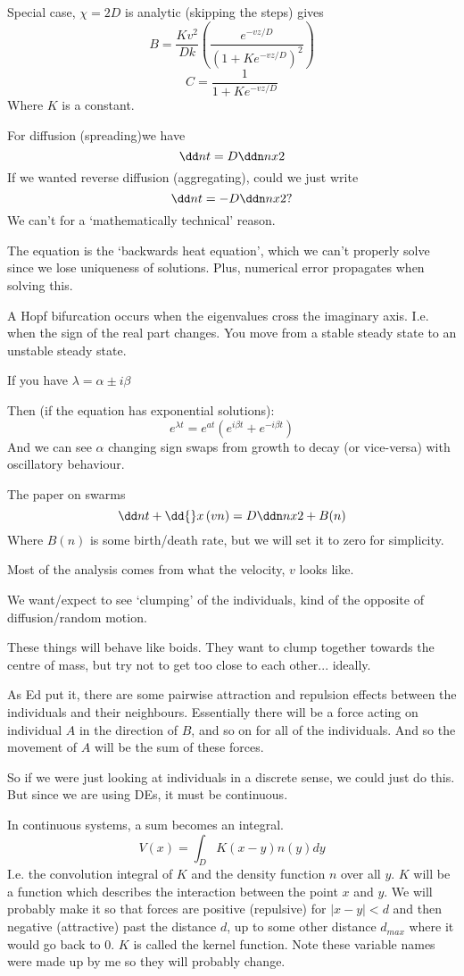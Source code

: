 \documentclass{X:/Documents/Coding/Latex/myassignment}
\begin{document}
Special case, $\chi = 2D$ is analytic (skipping the steps) gives
\[B = \frac{K v^2}{Dk} \left(\frac{e^{-vz/D}}{(1+Ke^{-vz/D})^2}\right) \]
\[C = \frac{1}{1 + Ke^{-vz/D}}\]
Where $K$ is a constant.


For diffusion (spreading)we have
\[\dd nt = D \ddn nx2 \]
If we wanted reverse diffusion (aggregating), could we just write 
\[\dd nt = -D \ddn nx2 ?\]
We can't for a `mathematically technical' reason.

The equation is the `backwards heat equation', which we can't properly solve since we lose uniqueness of solutions.
Plus, numerical error propagates when solving this.


A Hopf bifurcation occurs when the eigenvalues cross the imaginary axis. I.e. when the sign of the real part changes. You move from a stable steady state to an unstable steady state.

If you have $\lambda = \alpha \pm i \beta$

Then (if the equation has exponential solutions):
\[e^{\lambda t} = e^{at} (e^{i \beta t} + e^{-i \beta t})\]
And we can see $\alpha$ changing sign swaps from growth to decay (or vice-versa) with oscillatory behaviour.


The paper on swarms
\[\dd nt  + \dd{}x \left(vn\right) = D \ddn nx2 + B(n)\]
Where $B(n)$ is some birth/death rate, but we will set it to zero for simplicity.


Most of the analysis comes from what the velocity, $v$ looks like.

We want/expect to see `clumping' of the individuals, kind of the opposite of diffusion/random motion.

These things will behave like boids. They want to clump together towards the centre of mass, but try not to get too close to each other... ideally.

As Ed put it, there are some pairwise attraction and repulsion effects between the individuals and their neighbours. 
Essentially there will be a force acting on individual $A$ in the direction of $B$, and so on for all of the individuals. And so the movement of $A$ will be the sum of these forces.

So if we were just looking at individuals in a discrete sense, we could just do this. But since we are using DEs, it must be continuous.

In continuous systems, a sum becomes an integral.
\[V(x) = \int_{D} K(x-y) n(y) dy\] 
I.e. the convolution integral of $K$ and the density function $n$ over all $y$.
$K$ will be a function which describes the interaction between the point $x$ and $y$. We will probably make it so that forces are positive (repulsive) for $|x-y| < d$ and then negative (attractive) past the distance $d$, up to some other distance $d_{max}$ where it would go back to $0$. $K$ is called the kernel function.
Note these variable names were made up by me so they will probably change.
\end{document}
